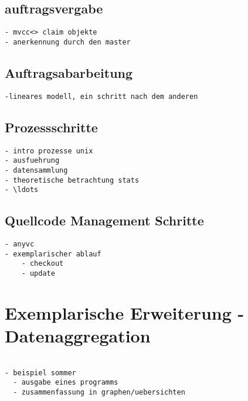\subsection{auftragsvergabe}

\begin{verbatim}
- mvcc<> claim objekte
- anerkennung durch den master

\end{verbatim}

\subsection{Auftragsabarbeitung}
\begin{verbatim}
-lineares modell, ein schritt nach dem anderen
\end{verbatim}

\subsection{Prozessschritte}

\begin{verbatim}
- intro prozesse unix
- ausfuehrung
- datensammlung
- theoretische betrachtung stats
- \ldots
\end{verbatim}

\subsection{Quellcode Management Schritte}


\begin{verbatim}
- anyvc
- exemplarischer ablauf
    - checkout
    - update
\end{verbatim}

\section{Exemplarische Erweiterung - Datenaggregation}

 
\begin{verbatim}

- beispiel sommer
  - ausgabe eines programms
  - zusammenfassung in graphen/uebersichten

\end{verbatim}

